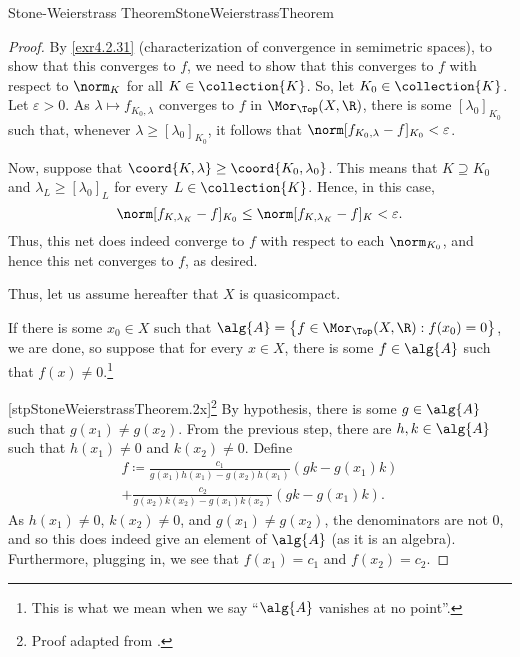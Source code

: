 \begin{thm}{Stone-Weierstrass Theorem}{StoneWeierstrassTheorem}
\begin{proof}
By \cref{exr4.2.31} (characterization of convergence in semimetric spaces), to show that this converges to $f$, we need to show that this converges to $f$ with respect to $\norm _K$ for all $K\in \collection{K}$.  So, let $K_0\in \collection{K}$.  Let $\varepsilon >0$.  As $\lambda \mapsto f_{K_0,\lambda}$ converges to $f$ in $\Mor _{\Top}(X,\R )$, there is some $[\lambda _0]_{K_0}$ such that, whenever $\lambda \geq [\lambda _0]_{K_0}$, it follows that $\norm[f_{K_0,\lambda}-f]_{K_0}<\varepsilon$.

Now, suppose that $\coord{K,\lambda}\geq \coord{K_0,\lambda _0}$.  This means that $K\supseteq K_0$ and $\lambda _L\geq [\lambda _0]_L$ for every $L\in \collection{K}$.  Hence, in this case,
\begin{equation}
\norm[f_{K,\lambda _K}-f]_{K_0}\leq \norm[f_{K,\lambda _K}-f]_K<\varepsilon .
\end{equation}
Thus, this net does indeed converge to $f$ with respect to each $\norm _{K_0}$, and hence this net converges to $f$, as desired.

Thus, let us assume hereafter that $X$ is quasicompact.

If there is some $x_0\in X$ such that $\alg{A}=\left\{ f\in \Mor _{\Top}(X,\R ):f(x_0)=0\right\}$, we are done, so suppose that for every $x\in X$, there is some $f\in \alg{A}$ such that $f(x)\neq 0$.\footnote{This is what we mean when we say ``$\alg{A}$ vanishes at no point''.}

[stpStoneWeierstrassTheorem.2x]\footnote{Proof adapted from \cite[Theorem 7.31]{Rudin}.}
By hypothesis, there is some $g\in \alg{A}$ such that $g(x_1)\neq g(x_2)$.  From the previous step, there are $h,k\in \alg{A}$ such that $h(x_1)\neq 0$ and $k(x_2)\neq 0$.  Define
\begin{equation}
\begin{multlined}
f\coloneqq \frac{c_1}{g(x_1)h(x_1)-g(x_2)h(x_1)}\left( gk-g(x_1)k\right) \\ +\frac{c_2}{g(x_2)k(x_2)-g(x_1)k(x_2)}\left( gk-g(x_1)k\right) .
\end{multlined}
\end{equation}
As $h(x_1)\neq 0$, $k(x_2)\neq 0$, and $g(x_1)\neq g(x_2)$, the denominators are not $0$, and so this does indeed give an element of $\alg{A}$ (as it is an algebra).  Furthermore, plugging in, we see that $f(x_1)=c_1$ and $f(x_2)=c_2$.


\end{proof}
\end{thm}
